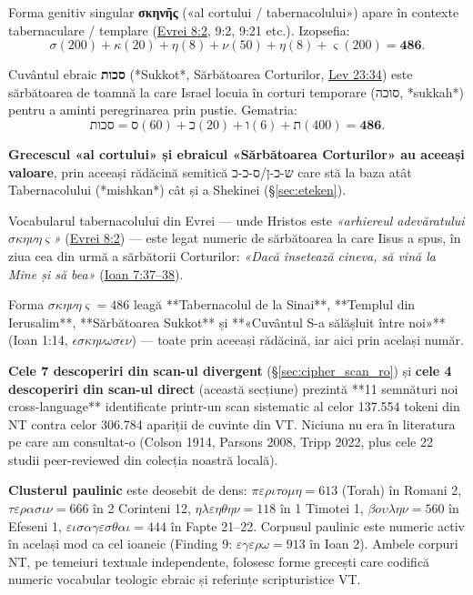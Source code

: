 \documentclass[12pt,a4paper,twoside,openany]{book}
\begin{document}
Forma genitiv singular \textbf{σκηνῆς} («al cortului / tabernacolului») apare în contexte tabernaculare / templare (\href{https://bibliaortodoxa.ro/carte.php?id=78\&cap=8\#2}{Evrei 8:2}, 9:2, 9:21 etc.). Izopsefia:
\[
\sigma(200) + \kappa(20) + \eta(8) + \nu(50) + \eta(8) + \varsigma(200) = \mathbf{486}.
\]

Cuvântul ebraic \textbf{סכות} (*Sukkot*, Sărbătoarea Corturilor, \href{https://bibliaortodoxa.ro/carte.php?id=3\&cap=23\#34}{Lev 23:34}) este sărbătoarea de toamnă la care Israel locuia în corturi temporare (סוכה, *sukkah*) pentru a aminti peregrinarea prin pustie. Gematria:
\[
\text{סכות} = \text{ס}(60) + \text{כ}(20) + \text{ו}(6) + \text{ת}(400) = \mathbf{486}.
\]

\textbf{Grecescul «al cortului» și ebraicul «Sărbătoarea Corturilor» au aceeași valoare}, prin aceeași rădăcină semitică ש-כ-ן/ס-כ-כ care stă la baza atât Tabernacolului (*mishkan*) cât și a Shekinei (\S\ref{sec:eteken}).

Vocabularul tabernacolului din Evrei — unde Hristos este \textit{«arhiereul adevăratului $\sigma\kappa\eta\nu\eta\varsigma$»} (\href{https://bibliaortodoxa.ro/carte.php?id=78\&cap=8\#2}{Evrei 8:2}) — este legat numeric de sărbătoarea la care Iisus a spus, în ziua cea din urmă a sărbătorii Corturilor: \textit{«Dacă însetează cineva, să vină la Mine și să bea»} (\href{https://bibliaortodoxa.ro/carte.php?id=35\&cap=7\#37}{Ioan 7:37--38}).

Forma $\sigma\kappa\eta\nu\eta\varsigma = 486$ leagă **Tabernacolul de la Sinai**, **Templul din Ierusalim**, **Sărbătoarea Sukkot** și **«Cuvântul S-a sălășluit între noi»** (Ioan 1:14, $\epsilon\sigma\kappa\eta\nu\omega\sigma\epsilon\nu$) — toate prin aceeași rădăcină, iar aici prin același număr.

\bigskip

\textbf{Cele 7 descoperiri din scan-ul divergent} (\S\ref{sec:cipher_scan_ro}) și \textbf{cele 4 descoperiri din scan-ul direct} (această secțiune) prezintă **11 semnături noi cross-language** identificate printr-un scan sistematic al celor 137.554 tokeni din NT contra celor 306.784 apariții de cuvinte din VT. Niciuna nu era în literatura pe care am consultat-o (Colson 1914, Parsons 2008, Tripp 2022, plus cele 22 studii peer-reviewed din colecția noastră locală).

\textbf{Clusterul paulinic} este deosebit de dens: $\pi\varepsilon\rho\iota\tau o\mu\eta = 613$ (Torah) în Romani 2, $\tau\varepsilon\rho\alpha\sigma\iota\nu = 666$ în 2 Corinteni 12, $\eta\lambda\varepsilon\eta\theta\eta\nu = 118$ în 1 Timotei 1, $\beta o\upsilon\lambda\eta\nu = 560$ în Efeseni 1, $\varepsilon\iota\sigma\alpha\gamma\varepsilon\sigma\theta\alpha\iota = 444$ în Fapte 21--22. Corpusul paulinic este numeric activ în același mod ca cel ioaneic (Finding 9: $\varepsilon\gamma\varepsilon\rho\omega = 913$ în Ioan 2). Ambele corpuri NT, pe temeiuri textuale independente, folosesc forme grecești care codifică numeric vocabular teologic ebraic și referințe scripturistice VT.
\end{document}
